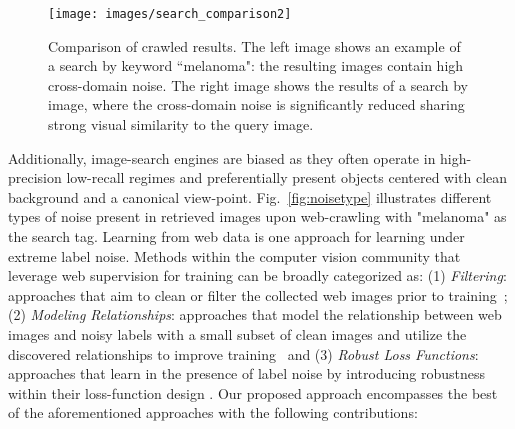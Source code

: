 \documentclass{llncs}
\begin{document}
\begin{figure}[ht]
\begin{center}
\texttt{[image: images/search\_comparison2]}
\end{center}
\vspace{-10pt}
\caption{\small{Comparison of crawled results. The left image shows an example of a search by keyword ``melanoma": the resulting images contain high cross-domain noise. The right image shows the results of a search by image, where the cross-domain noise is significantly reduced sharing strong visual similarity to the query image.}}
\label{fig:searchkeyword}
\vspace{-10pt}
\end{figure}
Additionally, image-search engines are biased as they often operate in high-precision low-recall regimes and preferentially present objects centered with clean background and a canonical view-point. Fig.~\ref{fig:noisetype} illustrates different types of noise present in retrieved images upon web-crawling with "melanoma" as the search tag. Learning from web data is one approach for learning under extreme label noise. Methods within the computer vision community that leverage web supervision for training can be broadly categorized as: (1) \textit{Filtering}: approaches that aim to clean or filter the collected web images prior to training~\cite{clean1,clean2}; (2) \textit{Modeling Relationships}: approaches that model the relationship between web images and noisy labels with a small subset of clean images and utilize the discovered relationships to improve training~\cite{graphical1,graphical2} and (3) \textit{Robust Loss Functions}: approaches that learn in the presence of label noise by introducing robustness within their loss-function design \cite{robust1,robust2}. Our proposed approach encompasses the best of the aforementioned approaches with the following contributions: 
\end{document}
